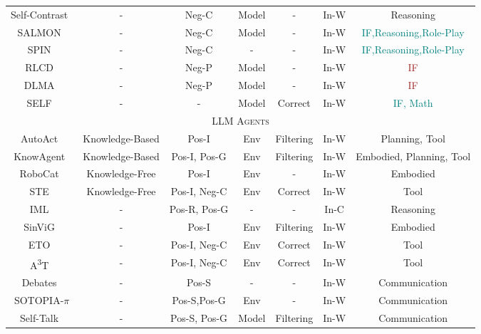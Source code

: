 \documentclass[sn-basic, Numbered]{sn-jnl}%
\theoremstyle{thmstyleone}%
\theoremstyle{thmstyletwo}%
\theoremstyle{thmstylethree}%
\begin{document}
\begin{table}
\begin{tabular}{ccccccc}
Self-Contrast~\cite{zhang2024self}    & -              & Neg-C    & Model      & -           & In-W       & Reasoning         \\
SALMON~\cite{sun2023salmon}           & -              & Neg-C    & Model      & -           & In-W       & \textcolor{teal}{IF,Reasoning,Role-Play}                \\
SPIN~\cite{chen2024self}              & -              & Neg-C    & -          & -           & In-W       & \textcolor{teal}{IF,Reasoning,Role-Play}                \\
RLCD~\cite{yang2023rlcd}              & -              & Neg-P    & Model      & -           & In-W       & \textcolor{brown}{IF}        \\
DLMA~\cite{liu2024direct}             & -              & Neg-P    & Model      & -           & In-W       & \textcolor{brown}{IF}            \\
SELF~\cite{lu2023self}                & -          & -        & Model      & Correct     & In-W       & \textcolor{teal}{IF, Math}          \\
\midrule
\multicolumn{7}{c}{\textsc{LLM Agents}} \\
\midrule
AutoAct~\cite{qiao2024autoact} & Knowledge-Based & Pos-I & Env & Filtering & In-W & Planning, Tool \\
KnowAgent~\cite{zhu2024knowagent} & Knowledge-Based & Pos-I, Pos-G & Env & Filtering & In-W & Embodied, Planning, Tool \\
RoboCat~\cite{bousmalis2023robocat} & Knowledge-Free & Pos-I & Env & - & In-W & Embodied \\
STE~\cite{wang2024llms} & Knowledge-Free & Pos-I, Neg-C & Env & Correct & In-W & Tool \\
IML~\cite{wang2024memory} & - & Pos-R, Pos-G & - & - & In-C & Reasoning \\
SinViG~\citet{xu2024sinvig} & - & Pos-I & Env & Filtering & In-W & Embodied \\
ETO~\cite{song2024trial} & - & Pos-I, Neg-C & Env & Correct & In-W & Tool \\
A\textsuperscript{3}T~\cite{yang2024react} & - & Pos-I, Neg-C & Env & Correct & In-W & Tool \\
Debates~\cite{taubenfeld2024systematic} & - & Pos-S & - & - & In-W & Communication \\
SOTOPIA-$\pi$ \cite{wang2024sotopia} & - & Pos-S,Pos-G & Env & - & In-W & Communication \\
Self-Talk~\cite{ulmer2024bootstrapping} & - & Pos-S, Pos-G & Model & Filtering & In-W & Communication \\

\end{tabular}
\end{table}
\end{document}
